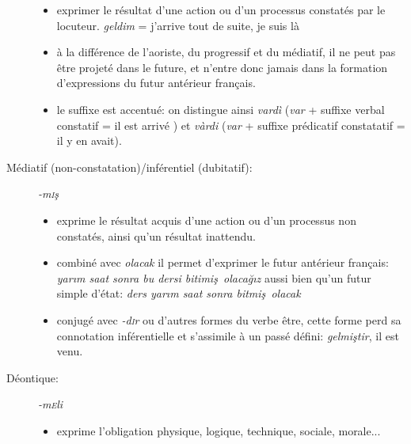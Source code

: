\documentclass{cours}
\newcommand{\ch}{\c{s}}
\newcommand{\ug}{\u{g}}
\newcommand{\sci}{\textsc{i}}
\newcommand{\sce}{\textsc{e}}
\begin{document}
\begin{description}
          \begin{itemize}
              \item exprimer le résultat d'une action ou d'un processus constatés par le locuteur. \textit{geldim} = j'arrive tout de suite, je suis là
              \item à la différence de l'aoriste, du progressif et du médiatif, il ne peut pas être projeté dans le future, et n'entre donc jamais dans la formation d'expressions du futur antérieur français.
              \item le suffixe est accentué: on distingue ainsi \textit{vard\`i} (\textit{var} + suffixe verbal constatif = \og il est arrivé \fg) et \textit{v\`ardi} (\textit{var} + suffixe prédicatif constatatif = \og il y en avait\fg).
          \end{itemize}
    \item [Médiatif (non-constatation)/inférentiel (dubitatif):] \textit{-m\sci\ch}
          \begin{itemize}
              \item exprime le résultat acquis d'une action ou d'un processus non constatés, ainsi qu'un résultat inattendu.
              \item combiné avec \textit{olacak} il permet d'exprimer le futur antérieur français: \textit{yar\i m saat sonra bu dersi bitimi\ch \ olaca\ug \i z} aussi bien qu'un futur simple d'état: \textit{ders yar\i m saat sonra bitmi\ch \ olacak}
              \item conjugé avec \textit{-d\sci r} ou d'autres formes du verbe être, cette forme perd sa connotation inférentielle et s'assimile à un passé défini: \textit{gelmi\ch tir}, il est venu.
          \end{itemize}
    \item [Déontique:] \textit{-m\sce li}
          \begin{itemize}
              \item exprime l'obligation physique, logique, technique, sociale, morale...
          \end{itemize}
\end{description}
\end{document}
